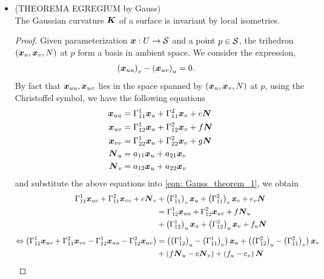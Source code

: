 \documentclass[11pt]{article}
\begin{document}
\begin{itemize}
\item \begin{theorem} \label{th: Gauss_theorem}
(THEOREMA EGREGIUM by Gauss)\\
The Gaussian curvature $\boldsymbol{K}$ of a surface is invariant by local isometries. 
\end{theorem}
\begin{proof}
Given parameterization $\boldsymbol{x}: U \rightarrow {\mathcal S}$ and a point $p\in {\mathcal S}$, the trihedron $(\boldsymbol{x}_{u}, \boldsymbol{x}_{v}, N)$ at $p$ form a basis in ambient space. We consider the expression, 
\begin{align}
\left(\boldsymbol{x}_{uu}\right)_{v} - \left(\boldsymbol{x}_{uv}\right)_{u} &= 0.  \label{eqn: Gauss_theorem_1}
\end{align}
By fact that $\boldsymbol{x}_{uu}, \boldsymbol{x}_{uv}$ lies in the space spanned by $(\boldsymbol{x}_{u}, \boldsymbol{x}_{v}, N)$ at $p$, using the Christoffel symbol, we have the following equations
\begin{align}
\boldsymbol{x}_{uu} &= \Gamma_{11}^{1}\boldsymbol{x}_{u} + \Gamma_{11}^{2}\boldsymbol{x}_{v} + e\boldsymbol{N}\nonumber\\
\boldsymbol{x}_{uv} &= \Gamma_{12}^{1}\boldsymbol{x}_{u} + \Gamma_{12}^{2}\boldsymbol{x}_{v} + f\boldsymbol{N}\nonumber\\
\boldsymbol{x}_{vv} &= \Gamma_{22}^{1}\boldsymbol{x}_{u} + \Gamma_{22}^{2}\boldsymbol{x}_{v} + g\boldsymbol{N}\nonumber\\
\boldsymbol{N}_{u} &= a_{11}\boldsymbol{x}_{u} + a_{21}\boldsymbol{x}_{v}
\nonumber\\
\boldsymbol{N}_{v} &= a_{12}\boldsymbol{x}_{u} + a_{22}\boldsymbol{x}_{v} \label{eqn: Gauss_theorem_2}
\end{align} 
and substitute the above equations into \eqref{eqn: Gauss_theorem_1}, we obtain
\begin{align*}
\Gamma_{11}^{1}\mb{x}_{uv} + \Gamma_{11}^{2}\mb{x}_{vv} + e\mb{N}_{v}
&+\paren{\Gamma_{11}^{1}}_{v}\mb{x}_{u} + \paren{\Gamma_{11}^{2}}_{v}\mb{x}_{v}+ e_{v}\mb{N}\\
&= \Gamma_{12}^{1}\mb{x}_{uu} + \Gamma_{12}^{2}\mb{x}_{uv} + f\mb{N}_{u}\\
&+ \paren{\Gamma_{12}^{1}}_{u}\mb{x}_{u} + \paren{\Gamma_{12}^{2}}_{u}\mb{x}_{v} + f_{u}\mb{N} \\[5pt]
\Leftrightarrow \paren{\Gamma_{11}^{1}\mb{x}_{uv} + \Gamma_{11}^{2}\mb{x}_{vv} - \Gamma_{12}^{1}\mb{x}_{uu} - \Gamma_{12}^{2}\mb{x}_{uv} }
&= \paren{\paren{\Gamma_{12}^{1}}_{u}-\paren{\Gamma_{11}^{1}}_{v}}\mb{x}_{u} + \paren{  \paren{\Gamma_{12}^{2}}_{u}- \paren{\Gamma_{11}^{2}}_{v}}\mb{x}_{v}\\
& +\paren{f\mb{N}_{u} - e\mb{N}_{v}}+ \paren{f_{u}-e_{v}}\mb{N}

\end{align*}
\end{proof}
\end{itemize}
\end{document}
